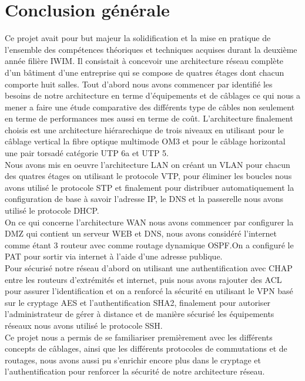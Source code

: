 \documentclass[12pt,a4paper]{report}
\begin{document}
		\section{Conclusion générale}
		Ce projet avait pour but majeur la solidification et la mise en
pratique de l’ensemble des compétences théoriques et techniques acquises durant la deuxième année filière IWIM. Il
consistait à concevoir une architecture réseau complète d’un bâtiment d’une entreprise qui se compose de quatres étages dont chacun comporte huit salles. Tout d'abord nous avons commencer par identifié les besoins de notre architecture en terme d'équipements et de câblages ce qui nous a mener a faire une étude comparative des différents type de câbles non seulement en terme de performances mes aussi en terme de coût.
L'architecture finalement choisis est une architecture hiérarechique de trois niveaux en utilisant pour le câblage vertical la fibre optique multimode OM3  et pour le câblage horizontal une pair torsadé catégorie UTP 6a et UTP 5.\\
Nous avons mis en oeuvre l'architecture LAN on créant un VLAN pour chacun des quatres étages on utilisant le protocole VTP, pour éliminer les boucles nous avons utilisé le protocole STP et finalement pour distribuer automatiquement la configuration de base à savoir l'adresse IP, le DNS et la passerelle nous avons utilisé le protocole DHCP.\\
On ce qui concerne l'architecture WAN nous avons commencer par configurer la DMZ qui contient un serveur WEB et DNS, nous avons considéré l'internet comme étant 3 routeur avec comme routage dynamique OSPF.On a configuré le PAT pour sortir via internet à l’aide d’une adresse publique.\\
Pour sécurisé notre réseau d'abord on utilisant une authentification avec CHAP entre les routeurs d'extrémités et internet, puis nous avons rajouter des ACL pour assurer l'identification et on a renforcé la sécurité en utilisant le VPN basé sur le cryptage AES et l'authentification SHA2, finalement pour autoriser l'administrateur de gérer à distance et de manière sécurisé les équipements réseaux nous avons utilisé le protocole SSH.\\
Ce projet nous a permis de se familiariser premièrement avec les différents concepts de câblages, ainsi que les différents protocoles de commutations et de routages, nous avons aussi pu s’enrichir encore plus dans le cryptage et l’authentification pour renforcer la sécurité de notre architecture réseau.\\
\end{document}
